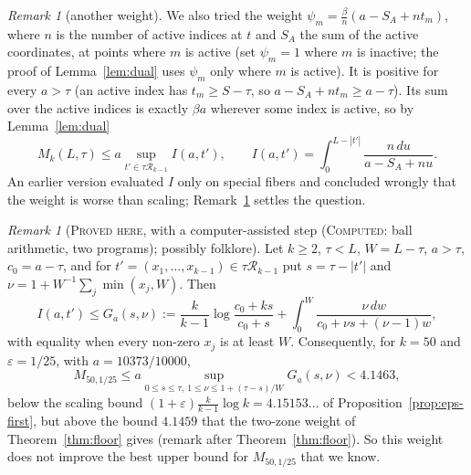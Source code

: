 \documentclass[11pt]{amsart}
\theoremstyle{definition}
\theoremstyle{remark}
\newtheorem{remark}[theorem]{Remark}
\newcommand{\lbl}[1]{\textup{\textsc{#1}}}
\newcommand{\R}{\mathcal{R}}
\begin{document}
\begin{remark}[another weight]
We also tried the weight $\psi_m=\frac{\beta}{n}(a-S_A+nt_m)$, where $n$ is
the number of active indices at $t$ and $S_A$ the sum of the active
coordinates, at points where $m$ is active (set $\psi_m=1$ where $m$ is
inactive; the proof of Lemma~\ref{lem:dual} uses $\psi_m$ only where $m$ is
active). It is positive for every $a>\tau$ (an active index has
$t_m\ge S-\tau$, so $a-S_A+nt_m\ge a-\tau$). Its sum over the active indices
is exactly $\beta a$ wherever some index is active, so by Lemma~\ref{lem:dual}
\[
M_k(L,\tau)\le a\sup_{t'\in\tau\R_{k-1}}I(a,t'),\qquad
I(a,t')=\int_0^{L-|t'|}\frac{n\,du}{a-S_A+nu}.
\]
An earlier version evaluated $I$ only on special fibers and concluded wrongly
that the weight is worse than scaling; Remark~\ref{prop:psi-weight} settles
the question.
\end{remark}

\begin{remark}[\lbl{Proved here}, with a computer-assisted step (\lbl{Computed}: ball arithmetic, two programs); possibly folklore]\label{prop:psi-weight}
Let $k\ge2$, $\tau<L$, $W=L-\tau$, $a>\tau$, $c_0=a-\tau$, and for
$t'=(x_1,\dots,x_{k-1})\in\tau\R_{k-1}$ put $s=\tau-|t'|$ and
$\nu=1+W^{-1}\sum_j\min(x_j,W)$. Then
\[
I(a,t')\le G_a(s,\nu):=\frac{k}{k-1}\log\frac{c_0+ks}{c_0+s}+\int_0^W\frac{\nu\,dw}{c_0+\nu s+(\nu-1)w},
\]
with equality when every non-zero $x_j$ is at least $W$. Consequently, for
$k=50$ and $\varepsilon=1/25$, with $a=10373/10000$,
\[
M_{50,1/25}\le a\sup_{0\le s\le\tau,\ 1\le\nu\le1+(\tau-s)/W}G_a(s,\nu)<4.1463,
\]
below the scaling bound $(1+\varepsilon)\frac{k}{k-1}\log k=4.15153\ldots$ of
Proposition~\ref{prop:eps-first}, but above the bound $4.1459$ that the
two-zone weight of Theorem~\ref{thm:floor} gives (remark after
Theorem~\ref{thm:floor}). So this weight does not improve the best upper bound for
$M_{50,1/25}$ that we know.
\end{remark}
\end{document}
